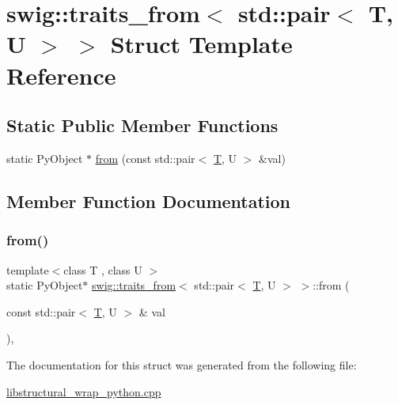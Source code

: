 \hypertarget{structswig_1_1traits__from_3_01std_1_1pair_3_01_t_00_01_u_01_4_01_4}{}\section{swig\+:\+:traits\+\_\+from$<$ std\+:\+:pair$<$ T, U $>$ $>$ Struct Template Reference}
\label{structswig_1_1traits__from_3_01std_1_1pair_3_01_t_00_01_u_01_4_01_4}
\subsection*{Static Public Member Functions}
\begin{DoxyCompactItemize}
\item 
static Py\+Object $\ast$ \hyperlink{structswig_1_1traits__from_3_01std_1_1pair_3_01_t_00_01_u_01_4_01_4_a8d5dbe4816fb56349947140186869e95}{from} (const std\+::pair$<$ \hyperlink{fmt_8h_a0acb682b8260ab1c60b918599864e2e5}{T}, U $>$ \&val)
\end{DoxyCompactItemize}


\subsection{Member Function Documentation}
\mbox{\label{structswig_1_1traits__from_3_01std_1_1pair_3_01_t_00_01_u_01_4_01_4_a8d5dbe4816fb56349947140186869e95}} 
\subsubsection{\texorpdfstring{from()}{from()}}
{\footnotesize\ttfamily template$<$class T , class U $>$ \\
static Py\+Object$\ast$ \hyperlink{structswig_1_1traits__from}{swig\+::traits\+\_\+from}$<$ std\+::pair$<$ \hyperlink{fmt_8h_a0acb682b8260ab1c60b918599864e2e5}{T}, U $>$ $>$\+::from (\begin{DoxyParamCaption}\item[{const std\+::pair$<$ \hyperlink{fmt_8h_a0acb682b8260ab1c60b918599864e2e5}{T}, U $>$ \&}]{val }\end{DoxyParamCaption})\hspace{0.3cm}{\ttfamily [inline]}, {\ttfamily [static]}}



The documentation for this struct was generated from the following file\+:\begin{DoxyCompactItemize}
\item 
\hyperlink{libstructural__wrap__python_8cpp}{libstructural\+\_\+wrap\+\_\+python.\+cpp}\end{DoxyCompactItemize}
